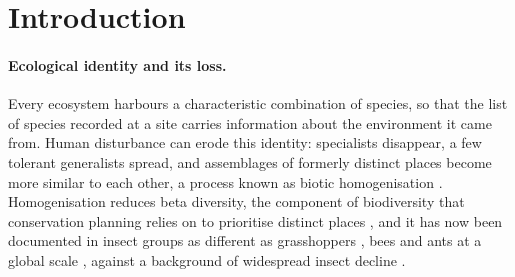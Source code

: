 \documentclass[10pt,a4paper,twocolumn]{article}
\begin{document}
\section{Introduction}\label{sec:intro}

\paragraph{Ecological identity and its loss.}
Every ecosystem harbours a characteristic combination of species, so that the list of species
recorded at a site carries information about the environment it came from. Human disturbance can
erode this identity: specialists disappear, a few tolerant generalists spread, and assemblages of
formerly distinct places become more similar to each other, a process known as biotic homogenisation
\citep{mckinney1999,olden2006}. Homogenisation reduces beta diversity, the component of biodiversity
that conservation planning relies on to prioritise distinct places \citep{socolar2016}, and it has
now been documented in insect groups as different as grasshoppers \citep{ogan2022}, bees
\citep{fisogni2025} and ants at a global scale \citep{aulus2024}, against a background of
widespread insect decline \citep{wagner2021}.
\end{document}
